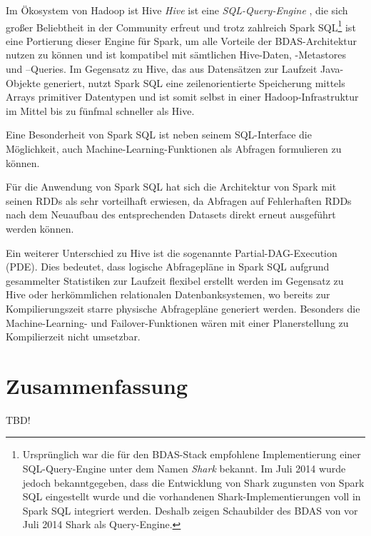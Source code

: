 Im Ökosystem von Hadoop ist Hive \textit{Hive} ist eine \textit{SQL-Query-Engine} , die sich großer Beliebtheit in der Community erfreut und trotz zahlreich  Spark SQL\footnote{Ursprünglich war die für den BDAS-Stack empfohlene Implementierung einer SQL-Query-Engine unter dem Namen \textit{Shark} bekannt. Im Juli 2014 wurde jedoch bekanntgegeben, dass die Entwicklung von Shark zugunsten von Spark SQL eingestellt wurde und die vorhandenen Shark-Implementierungen voll in Spark SQL integriert werden. Deshalb zeigen Schaubilder des BDAS von vor Juli 2014 Shark als Query-Engine.} ist eine Portierung dieser Engine für Spark, um alle Vorteile der BDAS-Architektur nutzen zu können und ist kompatibel mit sämtlichen Hive-Daten, -Metastores und –Queries. Im Gegensatz zu Hive, das aus Datensätzen zur Laufzeit Java-Objekte generiert, nutzt Spark SQL eine zeilenorientierte Speicherung mittels Arrays primitiver Datentypen und ist somit selbst in einer Hadoop-Infrastruktur im Mittel bis zu fünfmal schneller als Hive. 

Eine Besonderheit von Spark SQL ist neben seinem SQL-Interface die Möglichkeit, auch Machine-Learning-Funktionen als Abfragen formulieren zu können. 

Für die Anwendung von Spark SQL hat sich die Architektur von Spark mit seinen RDDs als sehr vorteilhaft erwiesen, da Abfragen auf Fehlerhaften RDDs nach dem Neuaufbau des entsprechenden Datasets direkt erneut ausgeführt werden können. 

Ein weiterer Unterschied zu Hive ist die sogenannte Partial-DAG-Execution (PDE). Dies bedeutet, dass logische Abfragepläne in Spark SQL aufgrund gesammelter Statistiken zur Laufzeit flexibel erstellt werden im Gegensatz zu Hive oder herkömmlichen relationalen Datenbanksystemen, wo bereits zur Kompilierungszeit starre physische Abfragepläne generiert werden. Besonders die Machine-Learning- und Failover-Funktionen wären mit einer Planerstellung zu Kompilierzeit nicht umsetzbar. 






\section{Zusammenfassung}
\label{section:zusammen}



TBD!
